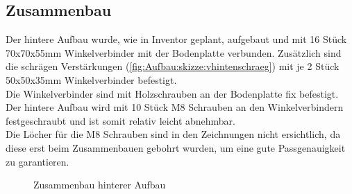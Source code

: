 \begin{landscape}
    \clearpage
    \clearpage
    \clearpage
    
\end{landscape}

\subsection{Zusammenbau}
Der hintere Aufbau wurde, wie in Inventor geplant, aufgebaut und mit 16 Stück 70x70x55mm Winkelverbinder mit der Bodenplatte verbunden. Zusätzlich sind die schrägen Verstärkungen (\autoref{fig:Aufbau:skizze:vhintenschraeg}) mit je 2 Stück 50x50x35mm Winkelverbinder befestigt.\\
Die Winkelverbinder sind mit Holzschrauben an der Bodenplatte fix befestigt. Der hintere Aufbau wird mit 10 Stück M8 Schrauben an den Winkelverbindern festgeschraubt und ist somit relativ leicht abnehmbar.\\
Die Löcher für die M8 Schrauben sind in den Zeichnungen nicht ersichtlich, da diese erst beim Zusammenbauen gebohrt wurden, um eine gute Passgenauigkeit zu garantieren.\\
\begin{figure}[H]
    \centering
    \caption{Zusammenbau hinterer Aufbau}
\end{figure}

\clearpage
